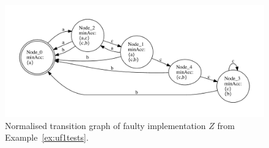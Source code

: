  \begin{figure}
 \begin{center}
\includegraphics[width=\textwidth]{z_acc.pdf}
\end{center}
\caption{Normalised transition graph of faulty implementation $Z$  from Example~\ref{ex:uf1tests}.}
 \label{fig:tgZ}
 \end{figure}

